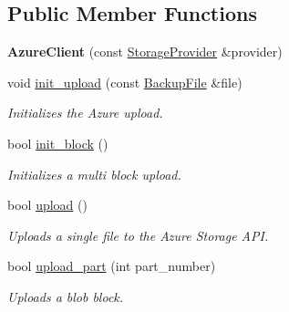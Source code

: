 \subsection*{Public Member Functions}
\begin{DoxyCompactItemize}
\item 
\mbox{\label{class_vessel_1_1_networking_1_1_azure_client_af23230f150558566932d144f335b983f}} 
{\bfseries Azure\+Client} (const \hyperlink{struct_vessel_1_1_types_1_1_storage_provider}{Storage\+Provider} \&provider)
\item 
\mbox{\label{class_vessel_1_1_networking_1_1_azure_client_a1618ca5045621c283d09b9deaf69d467}} 
void \hyperlink{class_vessel_1_1_networking_1_1_azure_client_a1618ca5045621c283d09b9deaf69d467}{init\+\_\+upload} (const \hyperlink{class_vessel_1_1_file_1_1_backup_file}{Backup\+File} \&file)
\begin{DoxyCompactList}\small\item\em Initializes the Azure upload. \end{DoxyCompactList}\item 
\mbox{\label{class_vessel_1_1_networking_1_1_azure_client_a3cc612beede266147a30d4cf1b02ed0e}} 
bool \hyperlink{class_vessel_1_1_networking_1_1_azure_client_a3cc612beede266147a30d4cf1b02ed0e}{init\+\_\+block} ()
\begin{DoxyCompactList}\small\item\em Initializes a multi block upload. \end{DoxyCompactList}\item 
bool \hyperlink{class_vessel_1_1_networking_1_1_azure_client_aea048602d61d1701883483b394c7a4d8}{upload} ()
\begin{DoxyCompactList}\small\item\em Uploads a single file to the Azure Storage A\+PI. \end{DoxyCompactList}\item 
bool \hyperlink{class_vessel_1_1_networking_1_1_azure_client_ae1b65c7d173d3592f0ab8b3fab80bebc}{upload\+\_\+part} (int part\+\_\+number)
\begin{DoxyCompactList}\small\item\em Uploads a blob block. \end{DoxyCompactList}\item 

\end{DoxyCompactItemize}
